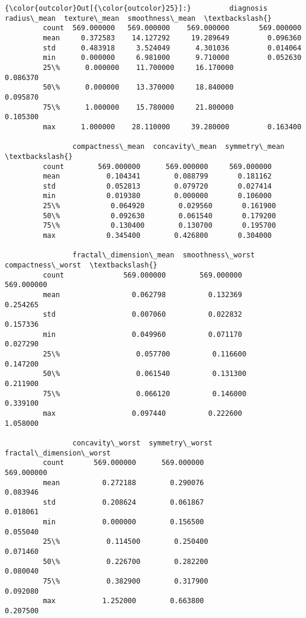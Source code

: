 \documentclass[11pt]{article}
\begin{document}
\begin{Verbatim}[commandchars=\\\{\}]
{\color{outcolor}Out[{\color{outcolor}25}]:}         diagnosis  radius\_mean  texture\_mean  smoothness\_mean  \textbackslash{}
         count  569.000000   569.000000    569.000000       569.000000   
         mean     0.372583    14.127292     19.289649         0.096360   
         std      0.483918     3.524049      4.301036         0.014064   
         min      0.000000     6.981000      9.710000         0.052630   
         25\%      0.000000    11.700000     16.170000         0.086370   
         50\%      0.000000    13.370000     18.840000         0.095870   
         75\%      1.000000    15.780000     21.800000         0.105300   
         max      1.000000    28.110000     39.280000         0.163400   
         
                compactness\_mean  concavity\_mean  symmetry\_mean  \textbackslash{}
         count        569.000000      569.000000     569.000000   
         mean           0.104341        0.088799       0.181162   
         std            0.052813        0.079720       0.027414   
         min            0.019380        0.000000       0.106000   
         25\%            0.064920        0.029560       0.161900   
         50\%            0.092630        0.061540       0.179200   
         75\%            0.130400        0.130700       0.195700   
         max            0.345400        0.426800       0.304000   
         
                fractal\_dimension\_mean  smoothness\_worst  compactness\_worst  \textbackslash{}
         count              569.000000        569.000000         569.000000   
         mean                 0.062798          0.132369           0.254265   
         std                  0.007060          0.022832           0.157336   
         min                  0.049960          0.071170           0.027290   
         25\%                  0.057700          0.116600           0.147200   
         50\%                  0.061540          0.131300           0.211900   
         75\%                  0.066120          0.146000           0.339100   
         max                  0.097440          0.222600           1.058000   
         
                concavity\_worst  symmetry\_worst  fractal\_dimension\_worst  
         count       569.000000      569.000000               569.000000  
         mean          0.272188        0.290076                 0.083946  
         std           0.208624        0.061867                 0.018061  
         min           0.000000        0.156500                 0.055040  
         25\%           0.114500        0.250400                 0.071460  
         50\%           0.226700        0.282200                 0.080040  
         75\%           0.382900        0.317900                 0.092080  
         max           1.252000        0.663800                 0.207500  
\end{Verbatim}
            
\end{document}
